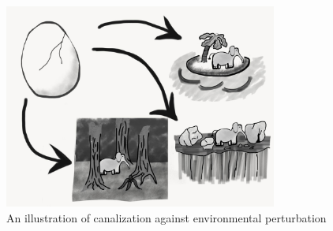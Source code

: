 \begin{figure} \label{fig:elephant_developmental_perturbation}
  \includegraphics[width=0.8\textwidth]{img/elephant_developmental_perturbation.jpg}
  \captionsetup{singlelinecheck=off,justification=raggedright}

  \caption{An illustration of canalization against environmental perturbation}
\end{figure}